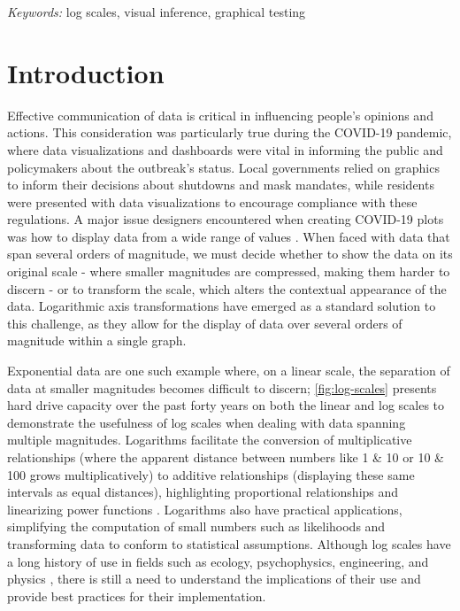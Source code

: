 \documentclass[12pt]{article}
\begin{document}
\noindent%
{\it Keywords:} log scales, visual inference, graphical testing

\vfill

\newpage
{} %

\section{Introduction}\label{introduction}

Effective communication of data is critical in influencing people's
opinions and actions. This consideration was particularly true during
the COVID-19 pandemic, where data visualizations and dashboards were
vital in informing the public and policymakers about the outbreak's
status. Local governments relied on graphics to inform their decisions
about shutdowns and mask mandates, while residents were presented with
data visualizations to encourage compliance with these regulations. A
major issue designers encountered when creating COVID-19 plots was how
to display data from a wide range of values
\citep{fagen-ulmschneider_2020, burnmurdoch_2020}. When faced with data
that span several orders of magnitude, we must decide whether to show
the data on its original scale - where smaller magnitudes are
compressed, making them harder to discern - or to transform the scale,
which alters the contextual appearance of the data. Logarithmic axis
transformations have emerged as a standard solution to this challenge,
as they allow for the display of data over several orders of magnitude
within a single graph.

Exponential data are one such example where, on a linear scale, the
separation of data at smaller magnitudes becomes difficult to discern;
\cref{fig:log-scales} presents hard drive capacity over the past forty
years on both the linear and log scales to demonstrate the usefulness of
log scales when dealing with data spanning multiple magnitudes.
Logarithms facilitate the conversion of multiplicative relationships
(where the apparent distance between numbers like 1 \& 10 or 10 \& 100
grows multiplicatively) to additive relationships (displaying these same
intervals as equal distances), highlighting proportional relationships
and linearizing power functions \citep{menge_logarithmic_2018}.
Logarithms also have practical applications, simplifying the computation
of small numbers such as likelihoods and transforming data to conform to
statistical assumptions. Although log scales have a long history of use
in fields such as ecology, psychophysics, engineering, and physics
\citep{heckler_student_2013, waddell2005comparisons}, there is still a
need to understand the implications of their use and provide best
practices for their implementation.
\end{document}
